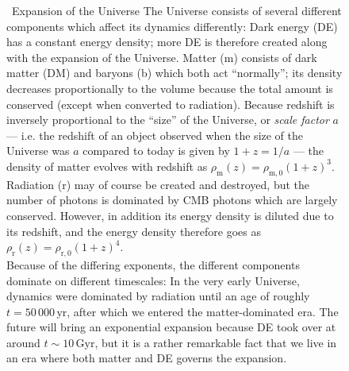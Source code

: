 \documentclass[useAMS,usenatbib,bibyear]{aa}
\begin{document}
\begin{figure}[!t]
\begin{bclogo}[
    couleur=gray!20,
    epBord=1,
    arrondi=0.1,
    logo=\bcinfo,
    marge=8,
    ombre=false, %
    couleurBord=gray!60,
    barre=line]
    { \ \textsf{Expansion of the Universe}}
    \small{\textsf{
        The Universe consists of several different components which affect its dynamics differently:
        Dark energy (DE) has a constant energy density; more DE is therefore created along with the expansion of the Universe.
        Matter (m) consists of dark matter (DM) and baryons (b) which both act ``normally''; its density decreases proportionally to the volume because the total amount is conserved (except when converted to radiation). Because redshift is inversely proportional to the ``size'' of the Universe, or \emph{scale factor} $a$ --- i.e. the redshift of an object observed when the size of the Universe was $a$ compared to today is given by $1+z=1/a$ --- the density of matter evolves with redshift as
        $\rho_\mathrm{m}(z) = \rho_\mathrm{m,0} (1+z)^3$.
        Radiation (r) may of course be created and destroyed, but the number of photons is dominated by CMB photons which are largely conserved. However, in addition its energy density is diluted due to its redshift, and the energy density therefore goes as
        $\rho_\mathrm{r}(z) = \rho_\mathrm{r,0} (1+z)^4$.\vspace{1mm}\\
        Because of the differing exponents, the different components dominate on different timescales:
        In the very early Universe, dynamics were dominated by radiation until an age of roughly $t = 50\,000\,\mathrm{yr}$, after which we entered the matter-dominated era.
        The future will bring an exponential expansion because DE took over at around $t\sim10\,\mathrm{Gyr}$, but it is a rather remarkable fact that we live in an era where both matter and DE governs the expansion.
    }}
\label{info:expansion}
\end{bclogo}
     \endminipage
\end{figure}
\end{document}
